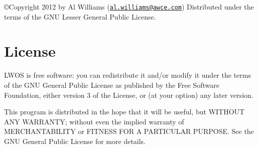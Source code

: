 \copyright \-Copyright 2012 by \-Al \-Williams (\href{mailto:al.williams@awce.com}{\tt al.\-williams@awce.\-com}) \-Distributed under the terms of the \-G\-N\-U \-Lesser \-General \-Public \-License.\hypertarget{index_license}{}\section{\-License}\label{index_license}
\-L\-W\-O\-S is free software\-: you can redistribute it and/or modify it under the terms of the \-G\-N\-U \-General \-Public \-License as published by the \-Free \-Software \-Foundation, either version 3 of the \-License, or (at your option) any later version.

\-This program is distributed in the hope that it will be useful, but \-W\-I\-T\-H\-O\-U\-T \-A\-N\-Y \-W\-A\-R\-R\-A\-N\-T\-Y; without even the implied warranty of \-M\-E\-R\-C\-H\-A\-N\-T\-A\-B\-I\-L\-I\-T\-Y or \-F\-I\-T\-N\-E\-S\-S \-F\-O\-R \-A \-P\-A\-R\-T\-I\-C\-U\-L\-A\-R \-P\-U\-R\-P\-O\-S\-E. \-See the \-G\-N\-U \-General \-Public \-License for more details.

